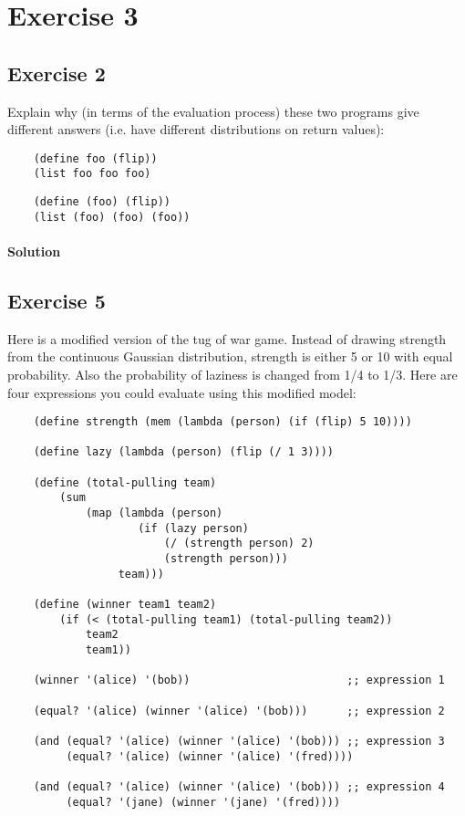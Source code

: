 \section*{Exercise 3}

\subsection*{Exercise 2}
Explain why (in terms of the evaluation process) these two programs give different answers 
(i.e. have different distributions on return values):
\begin{lstlisting}
    (define foo (flip))
    (list foo foo foo)
\end{lstlisting}

\begin{lstlisting}
    (define (foo) (flip))
    (list (foo) (foo) (foo))
\end{lstlisting}    

\paragraph{Solution}


\subsection*{Exercise 5}
Here is a modified version of the tug of war game. Instead of drawing strength from the continuous Gaussian 
distribution, strength is either 5 or 10 with equal probability. Also the probability of laziness is changed from 1/4 to 1/3. 
Here are four expressions you could evaluate using this modified model:

\begin{lstlisting}
    (define strength (mem (lambda (person) (if (flip) 5 10))))

    (define lazy (lambda (person) (flip (/ 1 3))))

    (define (total-pulling team)
        (sum 
            (map (lambda (person) 
                    (if (lazy person) 
                        (/ (strength person) 2) 
                        (strength person)))
                 team)))

    (define (winner team1 team2) 
        (if (< (total-pulling team1) (total-pulling team2)) 
            team2 
            team1))

    (winner '(alice) '(bob))                        ;; expression 1

    (equal? '(alice) (winner '(alice) '(bob)))      ;; expression 2

    (and (equal? '(alice) (winner '(alice) '(bob))) ;; expression 3
         (equal? '(alice) (winner '(alice) '(fred))))

    (and (equal? '(alice) (winner '(alice) '(bob))) ;; expression 4
         (equal? '(jane) (winner '(jane) '(fred))))
\end{lstlisting}

